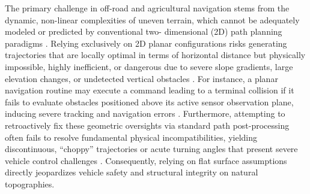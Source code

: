 The primary challenge in off-road and agricultural navigation stems from the
dynamic, non-linear complexities of uneven terrain, which cannot be adequately
modeled or predicted by conventional two- dimensional (2D) path planning
paradigms \citep{Bettencourt_2025_indoor25d}. Relying exclusively on 2D planar
configurations risks generating trajectories that are locally optimal in terms
of horizontal distance but physically impossible, highly inefficient, or
dangerous due to severe slope gradients, large elevation changes, or undetected
vertical obstacles \citep{Bettencourt_2025_indoor25d}. For instance, a planar
navigation routine may execute a command leading to a terminal collision if it
fails to evaluate obstacles positioned above its active sensor observation
plane, inducing severe tracking and navigation errors
\citep{Bettencourt_2025_indoor25d}. Furthermore, attempting to retroactively fix
these geometric oversights via standard path post-processing often fails to
resolve fundamental physical incompatibilities, yielding discontinuous,
``choppy'' trajectories or acute turning angles that present severe vehicle
control challenges \citep{Frey_2022_selfsupervisedneartofar}. Consequently,
relying on flat surface assumptions directly jeopardizes vehicle safety and
structural integrity on natural topographies.


